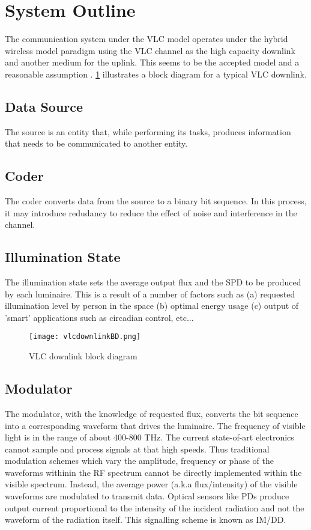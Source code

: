 \section{System Outline}
\label{sec:outline}
\graphicspath{{_Intro/Figures/}}

The communication system under the VLC model operates under the hybrid wireless model paradigm using the VLC channel as the high capacity downlink and another medium for the uplink. This seems to be the accepted model and a reasonable assumption \cite{rah11a}.  \figurename{ \ref{fig:VLCdownBD}} illustrates a block diagram for a typical VLC downlink. 

\subsection{Data Source}
\label{subsec:outlineSource}
The source is an entity that, while performing its tasks, produces information that needs to be communicated to another entity.

\subsection{Coder}
\label{subsec:outlineCoder}
The coder converts data from the source to a binary bit sequence. In this process, it may introduce redudancy to reduce the effect of noise and interference in the channel. 

\subsection{Illumination State}
\label{subsec:outlineIllumination}
The illumination state sets the average output flux and the SPD to be produced by each luminaire. This is a result of a number of factors such as (a) requested illumination level by person in the space (b) optimal energy usage (c) output of 'smart' applications such as circadian control, etc...

\begin{figure}[!t]
	\centering
		\texttt{[image: vlcdownlinkBD.png]}
	\caption{VLC downlink block diagram}
	\label{fig:VLCdownBD}
\end{figure}

\subsection{Modulator}
\label{subsec:outlineModulator}
The modulator, with the knowledge of requested flux, converts the bit sequence into a corresponding waveform that drives the luminaire. The frequency of visible light is in the range of about 400-800 THz. The current state-of-art electronics cannot sample and process signals at that high speeds. Thus traditional modulation schemes which vary the amplitude, frequency or phase of the waveforms withinin the RF spectrum cannot be directly implemented within the visible spectrum. Instead, the average power (a.k.a flux/intensity) of the visible waveforms are modulated to transmit data. Optical sensors like PDs produce output current proportional to the intensity of the incident radiation and not the waveform of the radiation itself. This signalling scheme is known as IM/DD. 

